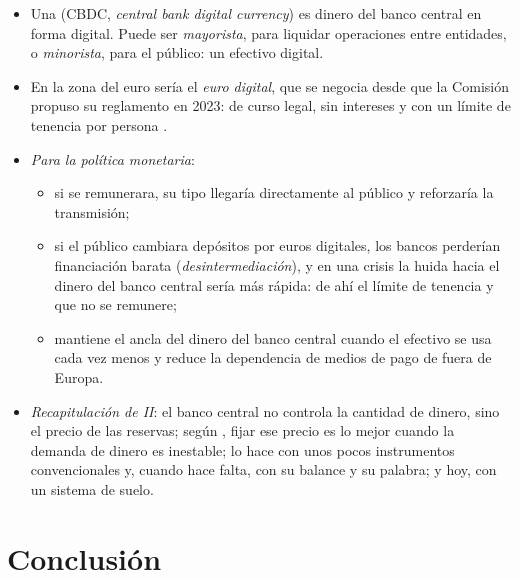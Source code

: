 \documentclass[11pt]{article}
\begin{document}
\begin{itemize}
\item Una  (CBDC, \emph{central bank digital currency}) es dinero del banco central en forma digital. Puede ser \emph{mayorista}, para liquidar operaciones entre entidades, o \emph{minorista}, para el público: un efectivo digital.
\item En la zona del euro sería el \emph{euro digital}, que se negocia desde que la Comisión propuso su reglamento en 2023: de curso legal, sin intereses y con un límite de tenencia por persona\nocite{Comision2023EuroDigital} .
\item \emph{Para la política monetaria}:
  \begin{itemize}
  \item si se remunerara, su tipo llegaría directamente al público y reforzaría la transmisión;
  \item si el público cambiara depósitos por euros digitales, los bancos perderían financiación barata (\emph{desintermediación}), y en una crisis la huida hacia el dinero del banco central sería más rápida: de ahí el límite de tenencia y que no se remunere;
  \item mantiene el ancla del dinero del banco central cuando el efectivo se usa cada vez menos y reduce la dependencia de medios de pago de fuera de Europa.
  \end{itemize}
\end{itemize}

\begin{itemize}
\item \emph{Recapitulación de II}: el banco central no controla la cantidad de dinero, sino el precio de las reservas; según , fijar ese precio es lo mejor cuando la demanda de dinero es inestable; lo hace con unos pocos instrumentos convencionales y, cuando hace falta, con su balance y su palabra; y hoy, con un sistema de suelo.
\end{itemize}

\section*{Conclusión}
\end{document}
